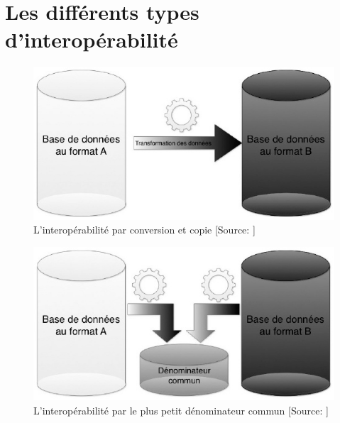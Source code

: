 \chapter{\label{annexe_types_interop}Les différents types d'interopérabilité}

\begin{figure}[!h]
	\centering
	\includegraphics[width=12cm]{images/interop_conversion_copie.jpeg}
	\medskip
	\caption{L'interopérabilité par conversion et copie [Source: \cite{bermes_2_2013}]}
\end{figure}

\begin{figure}[!h]
	\centering
	\includegraphics[width=12cm]{images/interop_denom_commun.jpeg}
	\medskip
	\caption{L'interopérabilité par le plus petit dénominateur commun [Source: \cite{bermes_2_2013}]}
\end{figure}